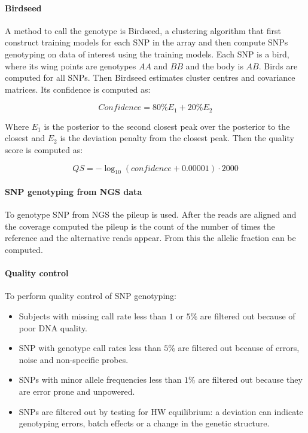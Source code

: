 			\paragraph{Birdseed}
			A method to call the genotype is Birdseed, a clustering algorithm that first construct training models for each SNP in the array and then compute SNPs genotyping on data of interest using the training models.
			Each SNP is a bird, where its wing points are genotypes $AA$ and $BB$ and the body is $AB$.
			Birds are computed for all SNPs.
			Then Birdseed estimates cluster centres and covariance matrices.
			Its confidence is computed as:

			$$Confidence = 80\% E_1 + 20\% E_2$$

			Where $E_1$ is the posterior to the second closest peak over the posterior to the closest and $E_2$ is the deviation penalty from the closest peak.
			Then the quality score is computed as:

			$$QS = -\log_{10}(confidence + 0.00001)\cdot 2000$$

			\paragraph{SNP genotyping from NGS data}
			To genotype SNP from NGS the pileup is used.
			After the reads are aligned and the coverage computed the pileup is the count of the number of times the reference and the alternative reads appear.
			From this the allelic fraction can be computed.

			\paragraph{Quality control}
			To perform quality control of SNP genotyping:

			\begin{multicols}{2}
				\begin{itemize}
					\item Subjects with missing call rate less than $1$ or $5\%$ are filtered out because of poor DNA quality.
					\item SNP with genotype call rates less than $5\%$ are filtered out because of errors, noise and non-specific probes.
					\item SNPs with minor allele frequencies less than $1\%$ are filtered out because they are error prone and unpowered.
					\item SNPs are filtered out by testing for HW equilibrium: a deviation can indicate genotyping errors, batch effects or a change in the genetic structure.
				\end{itemize}
			\end{multicols}

